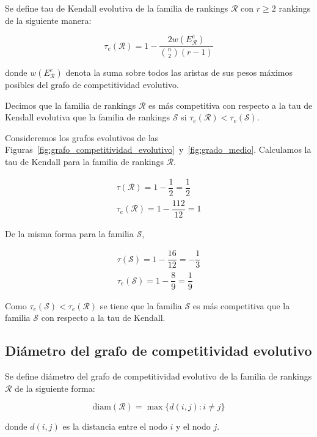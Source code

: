 \begin{defi}
Se define tau de Kendall evolutiva de la familia de rankings $\mathcal{R}$ con $r \geq 2$ rankings de la siguiente manera:

\begin{equation}
\tau_e(\mathcal{R}) = 1 - \dfrac{2 w(E_\mathcal{R}^e)}{\binom{n}{2}(r-1)}
\end{equation} 

donde $w(E_\mathcal{R}^e)$ denota la suma sobre todos las aristas de sus pesos máximos posibles del grafo de competitividad evolutivo.
\end{defi}

\begin{defi}
Decimos que la familia de rankings $\mathcal{R}$ es más competitiva con respecto a la tau de Kendall evolutiva que la familia de rankings $\mathcal{S}$ si $\tau_e(\mathcal{R}) < \tau_e(\mathcal{S})$.
\end{defi}

\begin{ejemplo}
Consideremos los grafos evolutivos de las Figuras~\ref{fig:grafo_competitividad_evolutivo}~y~\ref{fig:grado_medio}. Calculamos la tau de Kendall para la familia de rankings $\mathcal{R}$.

\begin{eqnarray}
\tau(\mathcal{R}) = 1 - \dfrac{1}{2} = \dfrac{1}{2}\\
\tau_e(\mathcal{R}) = 1 - \dfrac{112}{12} = 1
\end{eqnarray}

De la misma forma para la familia $\mathcal{S}$,

\begin{eqnarray}
\tau(\mathcal{S}) = 1 - \dfrac{16}{12} = -\dfrac{1}{3}\\
\tau_e(\mathcal{S}) = 1 - \dfrac{8}{9} = \dfrac{1}{9}
\end{eqnarray}

Como $\tau_e(\mathcal{S}) < \tau_e(\mathcal{R})$ se tiene que la familia $\mathcal{S}$ es más competitiva que la familia $\mathcal{S}$ con respecto a la tau de Kendall.

\end{ejemplo}

\subsection*{Diámetro del grafo de competitividad evolutivo}

\begin{defi}
Se define diámetro del grafo de competitividad evolutivo de la familia de rankings $\mathcal{R}$ de la siguiente forma:

\begin{equation}
\mathrm{diam}(\mathcal{R}) = \max \{ d(i,j) : i \neq j \}
\end{equation}

donde $d(i,j)$ es la distancia entre el nodo $i$ y el nodo $j$.
\end{defi}


